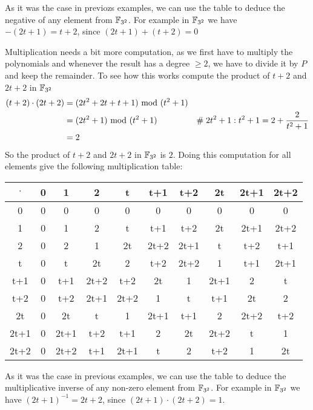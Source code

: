 \begin{example}
As it was the case in previozs examples, we can use the table to deduce the negative of any element from $\mathbb{F}_{3^2}$. For example in $\mathbb{F}_{3^2}$ we have $-(2t+1)= t+2$, since $(2t+1) + (t+2)=0$

Multiplication needs a bit more computation, as we first have to multiply the polynomials and whenever the result has a degree $\geq 2$, we have to divide it by $P$ and keep the remainder. To see how this works compute the product of $t+2$ and $2t+2$ in $\mathbb{F}_{3^2}$
\begin{align*}
(t+2) \cdot (2t+2) &= (2t^2 + 2t + t + 1) \text{ mod } (t^2+1) \\
                   &= (2t^2+1) \text{ mod } (t^2+1) & \#\; 2t^2+1:t^2+1= 2 + \frac{2}{t^2+1} \\
                   &= 2 
\end{align*}
So the product of $t+2$ and $2t+2$ in $\mathbb{F}_{3^2}$ is $2$. Doing this computation for all elements give the following multiplication table:
\begin{center}
  \begin{tabular}{c | c c c c c c c c c}
$\cdot$ & 0    & 1    & 2    & t    & t+1  & t+2  & 2t   & 2t+1 & 2t+2 \\\hline
      0 & 0    & 0    & 0    & 0    & 0    & 0    & 0    & 0    & 0 \\
      1 & 0    & 1    & 2    & t    & t+1  & t+2  & 2t   & 2t+1 & 2t+2\\
      2 & 0    & 2    & 1    & 2t   & 2t+2 & 2t+1 & t    & t+2  & t+1 \\
      t & 0    & t    & 2t   & 2    & t+2  & 2t+2 & 1    & t+1  & 2t+1  \\
    t+1 & 0    & t+1  & 2t+2 & t+2  & 2t   & 1    & 2t+1 & 2    & t   \\
    t+2 & 0    & t+2  & 2t+1 & 2t+2 & 1    & t    & t+1  & 2t   & 2    \\
     2t & 0    & 2t   & t    & 1    & 2t+1 & t+1  & 2  & 2t+2 & t+2\\
   2t+1 & 0    & 2t+1 & t+2  & t+1  & 2    & 2t   & 2t+2 & t    & 1    \\
   2t+2 & 0    & 2t+2 & t+1  & 2t+1 & t    & 2    & t+2  & 1     & 2t
  \end{tabular}
\end{center}
As it was the case in previous examples, we can use the table to deduce the multiplicative inverse of any non-zero element from $\mathbb{F}_{3^2}$. For example in $\mathbb{F}_{3^2}$ we have $(2t+1)^{-1}= 2t+2 $, since $(2t+1) \cdot (2t+2)=1$.


\end{example}
